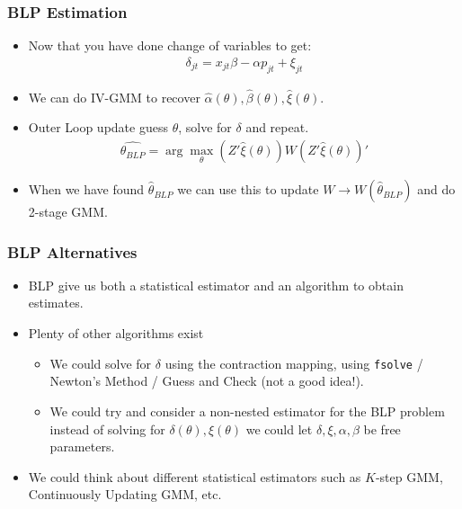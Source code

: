 \documentclass[xcolor=pdftex,dvipsnames,table,mathserif,aspectratio=169]{beamer}
\begin{document}
 \begin{frame}
\frametitle{BLP Estimation}
\begin{itemize}
 \item Now that you have done change of variables to get:
 \begin{eqnarray*}
\delta_{jt}= x_{jt} \beta -\alpha p_{jt}+  \xi_{jt}
 \end{eqnarray*}
 \item We can do IV-GMM to recover $\hat{\alpha}(\theta),\hat{\beta}(\theta),\hat{\xi}(\theta)$.
 \item Outer Loop update guess $\theta$, solve for $\delta$ and repeat.
 \begin{eqnarray*}
 \widehat{\theta_{BLP}} = \arg \max_{\theta} (Z' \hat{\xi}(\theta)) W  (Z' \hat{\xi}(\theta))'
 \end{eqnarray*}
 \item When we have found $\hat{\theta}_{BLP}$ we can use this to update $W \rightarrow W(\hat{\theta}_{BLP})$ and do 2-stage GMM.
 \end{itemize}
\end{frame}



 \begin{frame}
\frametitle{BLP Alternatives}
\begin{itemize}
 \item BLP give us both a statistical \alert{estimator} and an \alert{algorithm} to obtain estimates.
\item Plenty of other algorithms exist
\begin{itemize}
\item We could solve for $\delta$ using the contraction mapping, using \texttt{fsolve} / Newton's Method / Guess and Check (not a good idea!).
\item We could try and consider a non-nested estimator for the BLP problem instead of solving for $\delta(\theta),\xi(\theta)$ we could let $\delta,\xi,\alpha,\beta$ be free parameters.
 \end{itemize}
\item We could think about different statistical estimators such as $K$-step GMM, Continuously Updating GMM, etc.
 \end{itemize}
\end{frame}
\end{document}
